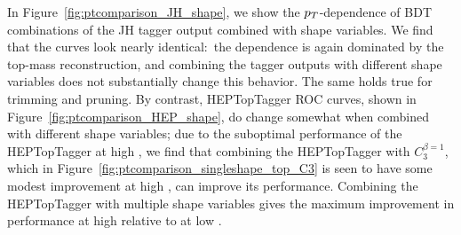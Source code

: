 In Figure~\ref{fig:ptcomparison_JH_shape}, we show the $p_T$-dependence of BDT combinations of the JH tagger output combined with shape variables. We find that the curves look nearly identical:~the \pt dependence is again dominated by the top-mass reconstruction, and combining the tagger outputs with different shape variables does not substantially change this behavior. The same holds true for trimming and pruning. By contrast,  HEPTopTagger ROC curves, shown in Figure~\ref{fig:ptcomparison_HEP_shape}, do change somewhat when combined with different shape variables; due to the suboptimal performance of the HEPTopTagger at high \pt, we find that combining the HEPTopTagger with $C_3^{\beta=1}$, which in Figure~\ref{fig:ptcomparison_singleshape_top_C3} is seen to have some modest improvement at high \pt, can improve its performance. Combining the HEPTopTagger with multiple shape variables gives the maximum improvement in performance at high \pt relative to at low \pt.\\

